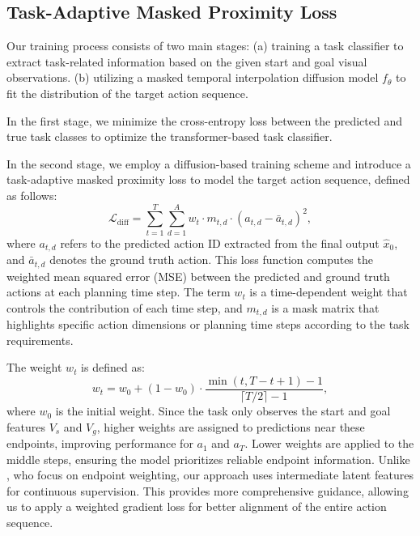 \subsection{Task-Adaptive Masked Proximity Loss}
\label{method3}


Our training process consists of two main stages: 
(a) training a task classifier to extract task-related information based on the given start and goal visual observations.
(b) utilizing a masked temporal interpolation diffusion model $f_\theta$ to fit the distribution of the target action sequence.


In the first stage, we minimize the cross-entropy loss between the predicted and true task classes to optimize the transformer-based task classifier.

In the second stage, we employ a diffusion-based training scheme and introduce a task-adaptive masked proximity loss to model the target action sequence, defined as follows:
\begin{equation}
    \mathcal{L}_{\mathrm{diff}} = \sum_{t=1}^{T} \sum_{d=1}^{A} w_t \cdot m_{t,d} \cdot (a_{t,d} - \bar{a}_{t,d})^2,
\end{equation}
where $a_{t,d}$ refers to the predicted action ID extracted from the final output $\hat{x}_0$, and $\bar{a}_{t,d}$ denotes the ground truth action. This loss function computes the weighted mean squared error (MSE) between the predicted and ground truth actions at each planning time step. The term $w_t$ is a time-dependent weight that controls the contribution of each time step, and $m_{t,d}$ is a mask matrix that highlights specific action dimensions or planning time steps according to the task requirements.

The weight \( w_t \) is defined as:
\begin{equation}
w_t = w_0 + (1 - w_0) \cdot \frac{\min(t, T - t + 1) - 1}{\lceil T/2 \rceil - 1},
\end{equation}
where \( w_0 \) is the initial weight. Since the task only observes the start and goal features $V_s$ and $V_g$, higher weights are assigned to predictions near these endpoints, improving performance for $a_1$ and $a_T$. Lower weights are applied to the middle steps, ensuring the model prioritizes reliable endpoint information. Unlike \citet{wang2023pdpp}, who focus on endpoint weighting, our approach uses intermediate latent features for continuous supervision. This provides more comprehensive guidance, allowing us to apply a weighted gradient loss for better alignment of the entire action sequence.

